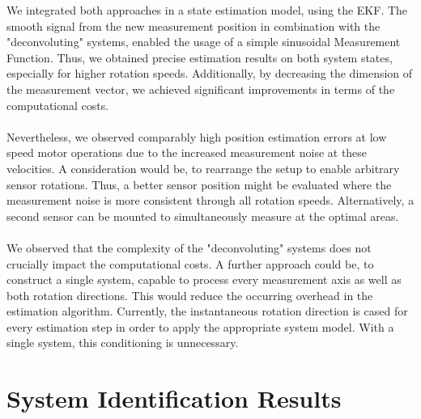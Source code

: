 \documentclass[english]{isasthesis}
\begin{document}
	We integrated both approaches in a state estimation model, using the EKF. The smooth signal from the new measurement position in combination with the "deconvoluting" systems, enabled the usage of a simple sinusoidal Measurement Function. Thus, we obtained precise estimation results on both system states, especially for higher rotation speeds. Additionally, by decreasing the dimension of the measurement vector, we achieved significant improvements in terms of the computational costs.\\\\
	Nevertheless, we observed comparably high position estimation errors at low speed motor operations due to the increased measurement noise at these velocities. A consideration would be, to rearrange the setup to enable arbitrary sensor rotations. Thus, a better sensor position might be evaluated where the measurement noise is more consistent through all rotation speeds. Alternatively, a second sensor can be mounted to simultaneously measure at the optimal areas.\\\\
	We observed that the complexity of the "deconvoluting" systems does not crucially impact the computational costs. A further approach could be, to construct a single system, capable to process every measurement axis as well as both rotation directions. This would reduce the occurring overhead in the estimation algorithm. Currently, the instantaneous rotation direction is cased for every estimation step in order to apply the appropriate system model. With a single system, this conditioning is unnecessary.
	\appendix
	\chapter{System Identification Results}
\end{document}
